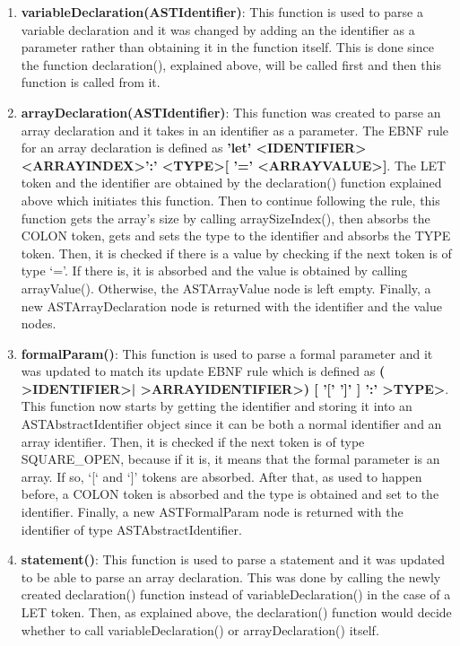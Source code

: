 \documentclass{article}
\begin{document}
\begin{enumerate}
				\item \textbf{variableDeclaration(ASTIdentifier)}: This function is used to parse a variable declaration and it was changed by adding an the identifier as a parameter rather than obtaining it in the function itself. This is done since the function declaration(), explained above, will be called first and then this function is called from it.
				
				\item \textbf{arrayDeclaration(ASTIdentifier)}: This function was created to parse an array declaration and it takes in an identifier as a parameter. The EBNF rule for an array declaration is defined as \textbf{'let' \textless IDENTIFIER\textgreater \textless ARRAYINDEX\textgreater ':' \textless TYPE\textgreater [ '=' \textless ARRAYVALUE\textgreater ]}. The LET token and the identifier are obtained by the declaration() function explained above which initiates this function. Then to continue following the rule, this function gets the array's size by calling arraySizeIndex(), then absorbs the COLON token, gets and sets the type to the identifier and absorbs the TYPE token. Then, it is checked if there is a value by checking if the next token is of type `='. If there is, it is absorbed and the value is obtained by calling arrayValue(). Otherwise, the ASTArrayValue node is left empty. Finally, a new ASTArrayDeclaration node is returned with the identifier and the value nodes.
				
				\item \textbf{formalParam()}: This function is used to parse a formal parameter and it was updated to match its update EBNF rule which is defined as \textbf{( \textgreater IDENTIFIER\textgreater | \textgreater ARRAYIDENTIFIER\textgreater )  [ '[' ']' ] ':' \textgreater TYPE\textgreater}. This function now starts by getting the identifier and storing it into an ASTAbstractIdentifier object since it can be both a normal identifier and an array identifier. Then, it is checked if the next token is of type SQUARE\_OPEN, because if it is, it means that the formal parameter is an array. If so, `[` and `]' tokens are 
							absorbed. After that, as used to happen before, a COLON token is absorbed and the type is obtained and set to the identifier. Finally, a new ASTFormalParam node is returned with the identifier of type ASTAbstractIdentifier.
							
		
					\item \textbf{statement()}: This function is used to parse a statement and it was updated to be able to parse an array declaration. This was done by calling the newly created declaration() function instead of variableDeclaration() in the case of a LET token. Then, as explained above, the declaration() function would decide whether to call variableDeclaration() or arrayDeclaration() itself.
				
			
				\end{enumerate}
				
\end{document}
